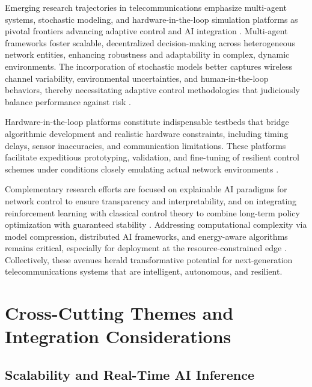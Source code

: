 \documentclass[sigconf]{acmart}
\begin{document}
Emerging research trajectories in telecommunications emphasize multi-agent systems, stochastic modeling, and hardware-in-the-loop simulation platforms as pivotal frontiers advancing adaptive control and AI integration \cite{ref46}. Multi-agent frameworks foster scalable, decentralized decision-making across heterogeneous network entities, enhancing robustness and adaptability in complex, dynamic environments. The incorporation of stochastic models better captures wireless channel variability, environmental uncertainties, and human-in-the-loop behaviors, thereby necessitating adaptive control methodologies that judiciously balance performance against risk \cite{ref46}.

Hardware-in-the-loop platforms constitute indispensable testbeds that bridge algorithmic development and realistic hardware constraints, including timing delays, sensor inaccuracies, and communication limitations. These platforms facilitate expeditious prototyping, validation, and fine-tuning of resilient control schemes under conditions closely emulating actual network environments \cite{ref46}.

Complementary research efforts are focused on explainable AI paradigms for network control to ensure transparency and interpretability, and on integrating reinforcement learning with classical control theory to combine long-term policy optimization with guaranteed stability \cite{ref50}. Addressing computational complexity via model compression, distributed AI frameworks, and energy-aware algorithms remains critical, especially for deployment at the resource-constrained edge \cite{ref49}. Collectively, these avenues herald transformative potential for next-generation telecommunications systems that are intelligent, autonomous, and resilient.

\section{Cross-Cutting Themes and Integration Considerations}

\subsection{Scalability and Real-Time AI Inference}
\end{document}
